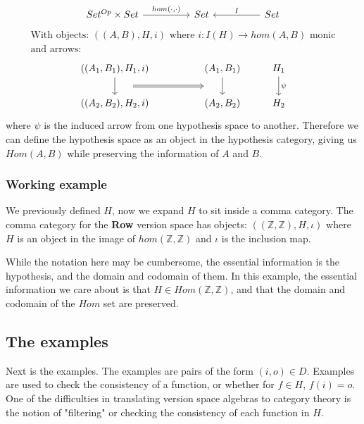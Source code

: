 \documentclass{article}
\theoremstyle{definition}
\begin{document}
\[\begin{tikzcd}
	{Set^{Op} \times Set} && Set && Set
	\arrow["{hom(\cdot, \cdot)}", from=1-1, to=1-3]
	\arrow["I"', from=1-5, to=1-3]
\end{tikzcd}\]
\begin{gather*}
    \text{With objects: } ((A,B), H, i) \text{ where $i: I(H) \rightarrow hom(A,B)$ monic} \\
    \text{and arrows: } 
\end{gather*}
\[\begin{tikzcd}
	{((A_1,B_1), H_1, i)} && {(A_1, B_1)} & {H_1} \\
	{((A_2,B_2),H_2, i)} && {(A_2,B_2)} & {H_2}
	\arrow[""{name=0, anchor=center, inner sep=0}, from=1-1, to=2-1]
	\arrow[""{name=1, anchor=center, inner sep=0}, from=1-3, to=2-3]
	\arrow["\psi", from=1-4, to=2-4]
	\arrow[shorten <=18pt, shorten >=18pt, Rightarrow, from=0, to=1]
\end{tikzcd}\]
where $\psi$ is the induced arrow from one hypothesis space to another. Therefore we can define the hypothesis space as an object in the hypothesis category, giving us $Hom(A,B)$ while preserving the information of $A$ and $B$.

\subsubsection{Working example}
We previously defined $H$, now we expand $H$ to sit inside a comma category. The comma category for the \textbf{Row} version space has objects: $((\mathbb{Z}, \mathbb{Z}), H, \iota)$ where $H$ is an object in the image of $hom(\mathbb{Z},\mathbb{Z})$ and $\iota$ is the inclusion map. 

While the notation here may be cumbersome, the essential information is the hypothesis, and the domain and codomain of them.  In this example, the essential information we care about is that $H \in Hom(\mathbb{Z}, \mathbb{Z})$, and that the domain and codomain of the $Hom$ set are preserved.  

\subsection{The examples}
Next is the examples. The examples are pairs of the form $(i,o) \in D$. Examples are used to check the consistency of a function, or whether for $f\in H$, $f(i) = o$. One of the difficulties in translating version space algebras to category theory is the notion of "filtering" or checking the consistency of each function in $H$.  
\end{document}

